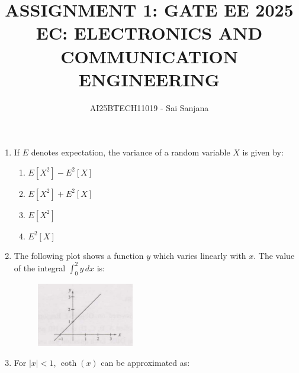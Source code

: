 \documentclass[journal,12pt,onecolumn]{IEEEtran}
\theoremstyle{remark}
\begin{document}
\title{
ASSIGNMENT 1: GATE EE 2025   \\
EC: ELECTRONICS AND COMMUNICATION ENGINEERING}
\author{AI25BTECH11019 - Sai Sanjana}
\maketitle
\renewcommand{\thefigure}{\theenumi}
\renewcommand{\thetable}{\theenumi}
\begin{enumerate}

\item If $ E $ denotes expectation, the variance of a random variable $ X $ is given by:
\hfill{}
\begin{enumerate}
    
    \item $ E[X^2] - E^2[X] $
    \item $ E[X^2] + E^2[X] $
    \item $ E[X^2] $
    \item $ E^2[X] $

\end{enumerate}


\item The following plot shows a function $y$ which varies linearly with $x$. The value of the integral $\int_{0}^{2} y \, dx$ is:
\hfill{}

\begin{figure}[ht!]
    \centering
    \includegraphics[width=0.4\textwidth]{Q2.jpg}
    \caption{}
    \label{fig:Q2.jpg}
\end{figure}


\begin{enumerate}
\end{enumerate}


\item For $|x| < 1 $, $ \coth(x)$ can be approximated as: 
\hfill{}
\begin{enumerate}
\end{enumerate}


\end{enumerate}
\end{document}
